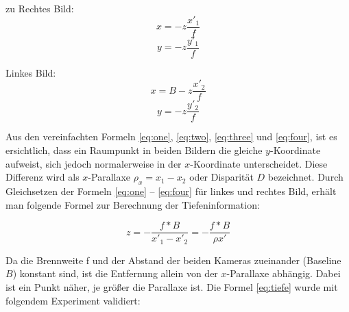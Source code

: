 \noindent zu\newline
\noindent Rechtes Bild:
\begin{equation}\label{eq:one}
x = -z \frac{x'_{1}}{f}
\end{equation}
\begin{equation}\label{eq:two}
y = -z \frac{y'_{1}}{f}
\end{equation}

\noindent Linkes Bild:
\begin{equation}\label{eq:three}
x = B-z \frac{x'_{2}}{f}
\end{equation}
\begin{equation}\label{eq:four}
y = -z \frac{y'_{2}}{f}
\end{equation}

\noindent Aus den vereinfachten Formeln \ref{eq:one}, \ref{eq:two}, \ref{eq:three} und \ref{eq:four}, ist es ersichtlich, dass ein Raumpunkt in beiden Bildern die gleiche $y$-Koordinate aufweist, sich jedoch normalerweise in der $x$-Koordinate unterscheidet. Diese Differenz wird als $x$-Parallaxe 
$\rho_{x} = x_{1} - x_{2}$ oder Disparität $D$ bezeichnet.\newline
\noindent Durch Gleichsetzen der Formeln \ref{eq:one} – \ref{eq:four} für linkes und rechtes Bild, erhält man folgende Formel zur Berechnung der Tiefeninformation:

\begin{equation}\label{eq:tiefe}
z = -\frac
{f*B}
{x'_{1}-x'_{2}}
=
-\frac
{f*B}
{\rho x'}
\end{equation}

\noindent Da die Brennweite f und der Abstand der beiden Kameras zueinander (Baseline $B$) konstant sind, ist die Entfernung allein von der $x$-Parallaxe abhängig. Dabei ist ein Punkt näher, je größer die Parallaxe ist. \newline
Die Formel \ref{eq:tiefe} wurde mit folgendem Experiment validiert:


